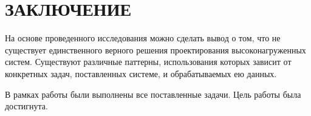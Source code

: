 \chapter*{ЗАКЛЮЧЕНИЕ}

На основе проведенного исследования можно сделать вывод о том, что не существует единственного верного решения проектирования высоконагруженных систем. Существуют различные паттерны, использования которых зависит от конкретных задач, поставленных системе, и обрабатываемых ею данных. 

В рамках работы были выполнены все поставленные задачи. Цель работы была достигнута.